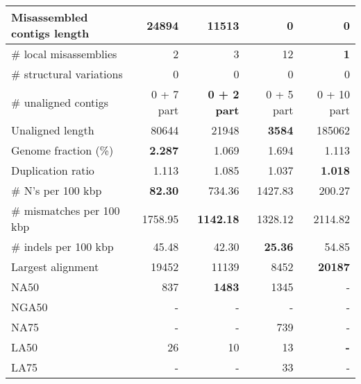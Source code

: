 \documentclass[12pt,a4paper]{article}
\begin{document}
\begin{table}[ht]
\begin{center}
\begin{tabular}{|l*{4}{|r}|}
Misassembled contigs length & 24894 & 11513 & {\bf 0} & {\bf 0} \\ \hline
\# local misassemblies & 2 & 3 & 12 & {\bf 1} \\ \hline
\# structural variations & 0 & 0 & 0 & 0 \\ \hline
\# unaligned contigs & 0 + 7 part & {\bf 0 + 2 part} & 0 + 5 part & 0 + 10 part \\ \hline
Unaligned length & 80644 & 21948 & {\bf 3584} & 185062 \\ \hline
Genome fraction (\%) & {\bf 2.287} & 1.069 & 1.694 & 1.113 \\ \hline
Duplication ratio & 1.113 & 1.085 & 1.037 & {\bf 1.018} \\ \hline
\# N's per 100 kbp & {\bf 82.30} & 734.36 & 1427.83 & 200.27 \\ \hline
\# mismatches per 100 kbp & 1758.95 & {\bf 1142.18} & 1328.12 & 2114.82 \\ \hline
\# indels per 100 kbp & 45.48 & 42.30 & {\bf 25.36} & 54.85 \\ \hline
Largest alignment & 19452 & 11139 & 8452 & {\bf 20187} \\ \hline
NA50 & 837 & {\bf 1483} & 1345 & - \\ \hline
NGA50 & - & - & - & - \\ \hline
NA75 & - & - & 739 & - \\ \hline
LA50 & 26 & 10 & 13 & {\bf -} \\ \hline
LA75 & - & - & 33 & - \\ \hline
\end{tabular}
\end{center}
\end{table}
\end{document}
